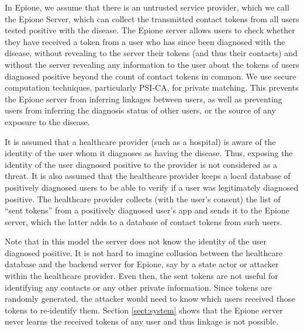 \documentclass[11pt]{article} %
\newcommand{\dect}{\textsf{Epione}\xspace}
\newcommand{\psica}{PSI-CA\xspace}
\newcommand{\remove}[1]{}
\begin{document}
In \dect, we assume that there is an untrusted service provider, which we call the \dect Server\remove{(or the backend server or just ``server'' for simplicity when it isn't ambiguous)}, which can collect the transmitted contact tokens from all users tested positive with the disease.
The \dect server allows users to check whether they have received a token from a user who has since been diagnosed with the disease, without revealing to the server their tokens (and thus their contacts) and without the server revealing any information to the user about the tokens of users diagnosed positive beyond the count of contact tokens in common. We use secure computation techniques, particularly \psica, for private matching. This prevents the \dect server from inferring linkages between users, as well as preventing users from inferring the diagnosis status of other users, or the source of any exposure to the disease.

It is assumed that a healthcare provider (such as a hospital)
is aware of the identity of the user whom it diagnoses as having the disease. Thus, exposing the identity of the user diagnosed positive to the provider is not considered as a threat. 
It is also assumed that the healthcare provider keeps a local database of positively diagnosed users to be able to verify if a user was legitimately diagnosed positive. The healthcare provider collects (with the user's consent) the list of ``sent tokens'' from a positively diagnosed user's app and sends it to the \dect server, which the latter adds to a database of contact tokens from such users.

Note that in this model the server does not know the identity of the user diagnosed positive. It is not hard to imagine collusion between the healthcare database and the backend server for \dect, say by a state actor or attacker within the healthcare provider. Even then, the sent tokens are not useful for identifying any contacts or any other private information. Since tokens are randomly generated, the attacker would need to know which users received those tokens to re-identify them. Section \ref{sect:system} shows that the \dect server never learns the received tokens of any user and thus linkage is not possible.
\end{document}
